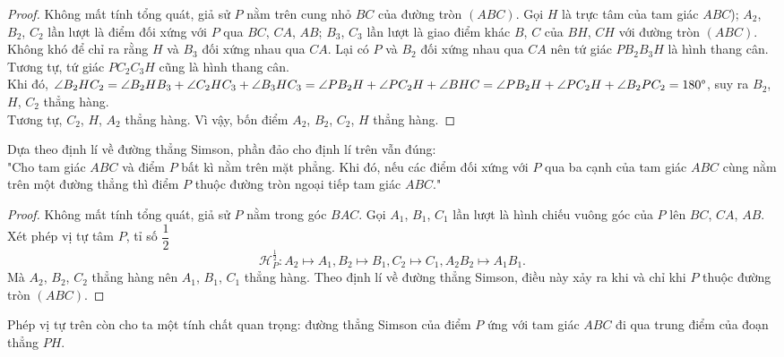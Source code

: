         \begin{proof}
            Không mất tính tổng quát, giả sử \(P\) nằm trên cung nhỏ \(BC\) của đường tròn \((ABC)\). Gọi \(H\) là trực tâm của tam giác \(ABC\)); \(A_2\), \(B_2\), \(C_2\) lần lượt là điểm đối xứng với \(P\) qua \(BC\), \(CA\), \(AB\); \(B_3\), \(C_3\) lần lượt là giao điểm khác \(B\), \(C\) của \(BH\), \(CH\) với đường tròn \((ABC)\).\\
            Không khó để chỉ ra rằng \(H\) và \(B_3\) đối xứng nhau qua \(CA\). Lại có \(P\) và \(B_2\) đối xứng nhau qua \(CA\) nên tứ giác \(PB_2B_3H\) là hình thang cân. Tương tự, tứ giác \(PC_2C_3H\) cũng là hình thang cân.\\
            Khi đó, \(\angle B_2HC_2 = \angle B_2HB_3 + \angle C_2HC_3 + \angle B_3HC_3 = \angle PB_2H + \angle PC_2H + \angle BHC = \angle PB_2H + \angle PC_2H + \angle B_2PC_2 = 180 \degree\), suy ra \(B_2\), \(H\), \(C_2\) thẳng hàng.\\
            Tương tự, \(C_2\), \(H\), \(A_2\) thẳng hàng. Vì vậy, bốn điểm \(A_2\), \(B_2\), \(C_2\), \(H\) thẳng hàng.
        \end{proof}

        \begin{remark}
            Dựa theo định lí về đường thẳng Simson, phần đảo cho định lí trên vẫn đúng:\\
            "Cho tam giác \(ABC\) và điểm \(P\) bất kì nằm trên mặt phẳng. Khi đó, nếu các điểm đối xứng với \(P\) qua ba cạnh của tam giác \(ABC\) cùng nằm trên một đường thẳng thì điểm \(P\) thuộc đường tròn ngoại tiếp tam giác \(ABC\)."
        \end{remark}

        \begin{proof}
            Không mất tính tổng quát, giả sử \(P\) nằm trong góc \(BAC\). Gọi \(A_1\), \(B_1\), \(C_1\) lần lượt là hình chiếu vuông góc của \(P\) lên \(BC\), \(CA\), \(AB\).\\
            Xét phép vị tự tâm \(P\), tỉ số \(\dfrac{1}{2}\)
            \[\mathcal{H}_P^{\frac{1}{2}}: A_2 \mapsto A_1, B_2 \mapsto B_1, C_2 \mapsto C_1, A_2B_2 \mapsto A_1B_1.\]
            Mà \(A_2\), \(B_2\), \(C_2\) thẳng hàng nên \(A_1\), \(B_1\), \(C_1\) thẳng hàng. Theo định lí về đường thẳng Simson, điều này xảy ra khi và chỉ khi \(P\) thuộc đường tròn \((ABC)\).
        \end{proof}

        \begin{remark}
            Phép vị tự trên còn cho ta một tính chất quan trọng: đường thẳng Simson của điểm \(P\) ứng với tam giác \(ABC\) đi qua trung điểm của đoạn thẳng \(PH\).
        \end{remark}

